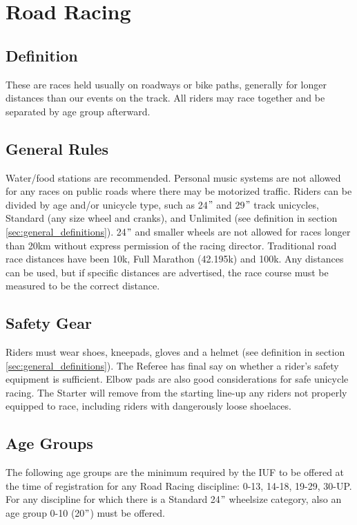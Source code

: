 \chapter*{Road Racing \label{chap:road_racing}}

\section{Definition} %
These are races held usually on roadways or bike paths, generally for longer distances than our events on the track.
All riders may race together and be separated by age group afterward.

\section{General Rules}
Water/food stations are recommended.
Personal music systems are not allowed for any races on public roads where there may be motorized traffic.
Riders can be divided by age and/or unicycle type, such as 24$"$ and 29$"$ track unicycles, Standard (any size wheel and cranks), and Unlimited (see definition in section \ref{sec:general_definitions}).
24$"$ and smaller wheels are not allowed for races longer than 20km without express permission of the racing director.
Traditional road race distances have been 10k, Full Marathon (42.195k) and 100k.
Any distances can be used, but if specific distances are advertised, the race course must be measured to be the correct distance.

\section{Safety Gear}
Riders must wear shoes, kneepads, gloves and a helmet (see definition in section \ref{sec:general_definitions}).
The Referee has final say on whether a rider’s safety equipment is sufficient.
Elbow pads are also good considerations for safe unicycle racing.
The Starter will remove from the starting line-up any riders not properly equipped to race, including riders with dangerously loose shoelaces.

\section{Age Groups}
The following age groups are the minimum required by the IUF to be offered at the time of registration for any Road Racing discipline: 0-13, 14-18, 19-29, 30-UP.
For any discipline for which there is a Standard 24$"$ wheelsize category, also an age group 0-10 (20$"$) must be offered.

